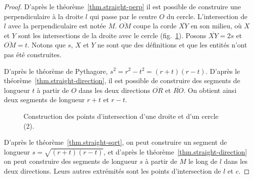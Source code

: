 \begin{proof}
D'après le théorème~\ref{thm.straight-perp} il est possible de construire une perpendiculaire à la droite $l$ qui passe par le centre $O$ du cercle. L'intersection de $l$ avec la perpendiculaire est notée $M$.  $\overline{OM}$ coupe la corde $\overline{XY}$ en son milieu, où $X$ et $Y$ sont les intersections de la droite avec le cercle (fig.~\ref{f.se-line-circle2}). Posons $\overline{XY}=2s$ et $\overline{OM}=t$. Notons que $s$, $X$ et $Y$ ne sont que des définitions et que les entités n'ont pas été construites.


D'après le théorème de Pythagore, $s^2=r^2-t^2=(r+t)(r-t)$. D'après le théorème~\ref{thm.straight-direction}, il est possible de construire des segments de longueur $t$ à partir de $O$ dans les deux directions $\overline{OR}$ et $\overline{RO}$. On obtient ainsi deux segments de longueur $r+t$ et $r-t$.

\begin{figure}[htbp]
\centering    
{}
\caption{Construction des points d'intersection d'une droite et d'un cercle 
 (2).}\label{f.se-line-circle2}
\end{figure}



D'après le théorème~\ref{thm.straight-sqrt}, on peut construire un segment  de longueur $s=\sqrt{(r+t)(r-t)}$, et d'après le théorème~\ref{thm.straight-direction} on peut construire des segments  de longueur $s$ à partir de $M$ le long de $l$ dans les deux directions. Leurs autres extrémités sont les points d'intersection de $l$ et $c$.
\end{proof}


